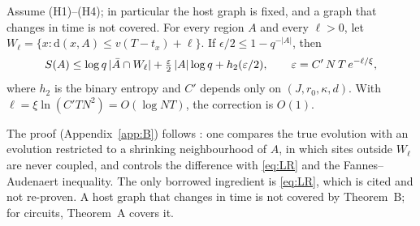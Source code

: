 \begin{theoremL}\label{thm:B}
Assume (H1)--(H4); in particular the host graph is fixed, and a graph that changes in time is not covered. For every region $A$ and every $\ell>0$, let $W_\ell=\{x:\mathrm d(x,A)\le v(T-t_x)+\ell\}$. If $\epsilon/2\le1-q^{-|A|}$, then
\begin{equation}
S(A)\le\log q\,|\bar A\cap W_\ell|+\tfrac{\varepsilon}{2}\,|A|\log q+h_2(\varepsilon/2),\qquad \varepsilon=C'\,N\,T\,e^{-\ell/\xi},
\end{equation}
where $h_2$ is the binary entropy and $C'$ depends only on $(J,r_0,\kappa,d)$. With $\ell=\xi\ln(C'TN^2)=O(\log NT)$, the correction is $O(1)$.
\end{theoremL}

The proof (Appendix~\ref{app:B}) follows \cite{BHV2006}: one compares the true evolution with an evolution restricted to a shrinking neighbourhood of $A$, in which sites outside $W_\ell$ are never coupled, and controls the difference with \eqref{eq:LR} and the Fannes--Audenaert inequality. The only borrowed ingredient is \eqref{eq:LR}, which is cited and not re-proven. A host graph that changes in time is not covered by Theorem~B; for circuits, Theorem~A covers it.
